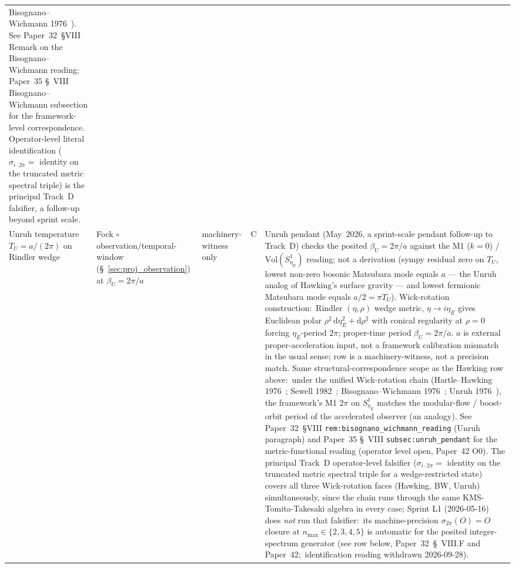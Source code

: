 \documentclass[11pt]{article}
\begin{document}
{\begin{longtable}{p{3.8cm} p{2.5cm} p{1.5cm} p{1.4cm} p{4.5cm}}
Bisognano--Wichmann 1976~\cite{bisognano_wichmann1976}).  See
Paper~32~§VIII Remark on the Bisognano--Wichmann reading; Paper~35
\S~VIII Bisognano--Wichmann subsection for the framework-level
correspondence.  Operator-level
literal identification ($\sigma_{i\cdot 2\pi} = $ identity on the
truncated metric spectral triple) is the principal Track~D
falsifier, a follow-up beyond sprint scale. \\
Unruh temperature $T_U = a/(2\pi)$ on Rindler wedge &
Fock $\circ$ observation/temporal-window
(\S~\ref{sec:proj_observation}) at $\beta_U = 2\pi/a$ &
machinery-witness only & C &
Unruh pendant (May~2026,
a sprint-scale pendant follow-up to Track~D) checks the posited
$\beta_U = 2\pi/a$ against the M1 ($k = 0$) /
$\mathrm{Vol}(S^1_{\eta_E})$ reading; not a derivation (sympy residual zero on
$T_U$, lowest non-zero bosonic Matsubara mode equals $a$ --- the Unruh
analog of Hawking's surface gravity --- and lowest fermionic
Matsubara mode equals $a/2 = \pi T_U$).  Wick-rotation construction:\
Rindler $(\eta, \rho)$ wedge metric, $\eta \to i\eta_E$ gives
Euclidean polar $\rho^2\, \mathrm{d}\eta_E^2 + \mathrm{d}\rho^2$ with
conical regularity at $\rho = 0$ forcing $\eta_E$-period $2\pi$;
proper-time period $\beta_U = 2\pi/a$.  $a$ is external
proper-acceleration input, not a framework calibration mismatch in
the usual sense; row is a machinery-witness, not a precision match.
Same structural-correspondence scope as the Hawking row above:\ under
the unified Wick-rotation chain (Hartle--Hawking
1976~\cite{hartle_hawking1976}; Sewell 1982~\cite{sewell1982};
Bisognano--Wichmann 1976~\cite{bisognano_wichmann1976};
Unruh 1976~\cite{unruh1976}), the framework's M1 $2\pi$ on
$S^1_{\eta_E}$ matches the modular-flow / boost-orbit period of the
accelerated observer (an analogy).  See Paper~32~§VIII
\texttt{rem:bisognano\_wichmann\_reading} (Unruh paragraph) and
Paper~35 \S~VIII \texttt{subsec:unruh\_pendant} for the
metric-functional reading (operator level open, Paper~42 O0).  The principal Track~D operator-level falsifier
($\sigma_{i\cdot 2\pi} = $ identity on the truncated metric spectral
triple for a wedge-restricted state) covers all three
Wick-rotation faces (Hawking, BW, Unruh) simultaneously, since the
chain runs through the same KMS-Tomita-Takesaki algebra in every case;
Sprint L1 (2026-05-16) does \emph{not} run that falsifier:\ its
machine-precision $\sigma_{2\pi}(O) = O$ closure at $n_{\max} \in
\{2, 3, 4, 5\}$ is automatic for the posited integer-spectrum
generator (see row below, Paper~32~\S~VIII.F and Paper~42;\
identification reading withdrawn 2026-09-28). \\

\end{longtable}}
\end{document}
